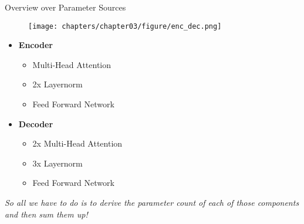 \begin{frame}{Overview over Parameter Sources}
\vfill
\begin{minipage}[c]{.49\textwidth}
    \vfill
    \begin{figure}
		\centering
		\texttt{[image: chapters/chapter03/figure/enc\_dec.png]}
	\end{figure}
    \vfill
\end{minipage}
\hfill
\begin{minipage}[c]{.49\textwidth}
    \hfill
    \begin{itemize}
        \item \textbf{Encoder}
        \begin{itemize}
            \item Multi-Head Attention
            \item 2x Layernorm
            \item Feed Forward Network
        \end{itemize}
        \item \textbf{Decoder}
        \begin{itemize}
            \item 2x Multi-Head Attention
            \item 3x Layernorm
            \item Feed Forward Network
        \end{itemize}
    \end{itemize}
\end{minipage}
\vfill
\textit{So all we have to do is to derive the parameter count of each of those components and then sum them up!} 

\end{frame}


